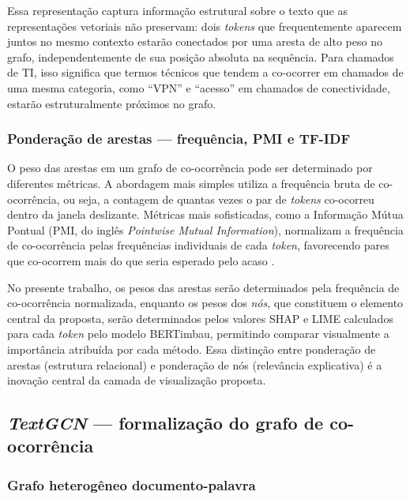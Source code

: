 \documentclass[
    12pt,                %
    openright,           %
    oneside,             %
    a4paper,             %
    english,             %
    brazil               %
]{abntex2}
\begin{document}
Essa representação captura informação estrutural sobre o texto que as representações vetoriais não preservam: dois \textit{tokens} que frequentemente aparecem juntos no mesmo contexto estarão conectados por uma aresta de alto peso no grafo, independentemente de sua posição absoluta na sequência. Para chamados de TI, isso significa que termos técnicos que tendem a co-ocorrer em chamados de uma mesma categoria, como ``VPN'' e ``acesso'' em chamados de conectividade, estarão estruturalmente próximos no grafo.

\subsubsection{Ponderação de arestas — frequência, PMI e TF-IDF}
\label{subsubsec:grafos_ponderacao}

O peso das arestas em um grafo de co-ocorrência pode ser determinado por diferentes métricas. A abordagem mais simples utiliza a frequência bruta de co-ocorrência, ou seja, a contagem de quantas vezes o par de \textit{tokens} co-ocorreu dentro da janela deslizante. Métricas mais sofisticadas, como a Informação Mútua Pontual (PMI, do inglês \textit{Pointwise Mutual Information}), normalizam a frequência de co-ocorrência pelas frequências individuais de cada \textit{token}, favorecendo pares que co-ocorrem mais do que seria esperado pelo acaso \cite{yao2019}.

No presente trabalho, os pesos das arestas serão determinados pela frequência de co-ocorrência normalizada, enquanto os pesos dos \textit{nós}, que constituem o elemento central da proposta, serão determinados pelos valores SHAP e LIME calculados para cada \textit{token} pelo modelo BERTimbau, permitindo comparar visualmente a importância atribuída por cada método. Essa distinção entre ponderação de arestas (estrutura relacional) e ponderação de nós (relevância explicativa) é a inovação central da camada de visualização proposta.

\subsection{\textit{TextGCN} — formalização do grafo de co-ocorrência}
\label{subsec:textgcn}

\subsubsection{Grafo heterogêneo documento-palavra}
\label{subsubsec:textgcn_grafo}
\end{document}
